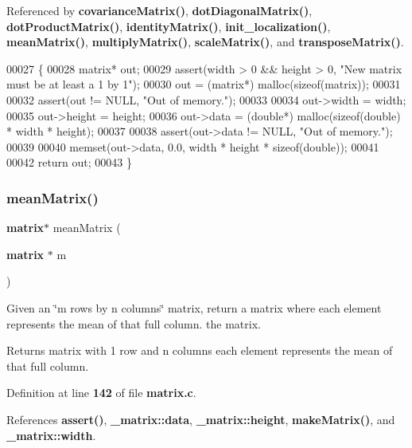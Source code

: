 Referenced by \textbf{ covariance\+Matrix()}, \textbf{ dot\+Diagonal\+Matrix()}, \textbf{ dot\+Product\+Matrix()}, \textbf{ identity\+Matrix()}, \textbf{ init\+\_\+localization()}, \textbf{ mean\+Matrix()}, \textbf{ multiply\+Matrix()}, \textbf{ scale\+Matrix()}, and \textbf{ transpose\+Matrix()}.


\begin{DoxyCode}
00027                                           \{
00028     matrix* out;
00029     assert(width > 0 && height > 0, \textcolor{stringliteral}{"New matrix must be at least a 1 by 1"});
00030     out = (matrix*) malloc(\textcolor{keyword}{sizeof}(matrix));
00031 
00032     assert(out != NULL, \textcolor{stringliteral}{"Out of memory."});
00033 
00034     out->width = width;
00035     out->height = height;
00036     out->data = (\textcolor{keywordtype}{double}*) malloc(\textcolor{keyword}{sizeof}(\textcolor{keywordtype}{double}) * width * height);
00037 
00038     assert(out->data != NULL, \textcolor{stringliteral}{"Out of memory."});
00039 
00040     memset(out->data, 0.0, width * height * \textcolor{keyword}{sizeof}(\textcolor{keywordtype}{double}));
00041 
00042     \textcolor{keywordflow}{return} out;
00043 \}
\end{DoxyCode}
\mbox{\label{matrix_8h_ae4babf9b518a2d5d6b12776191e3b7de}} 
\subsubsection{mean\+Matrix()}
{\footnotesize\ttfamily \textbf{ matrix}$\ast$ mean\+Matrix (\begin{DoxyParamCaption}\item[{\textbf{ matrix} $\ast$}]{m }\end{DoxyParamCaption})}



Given an \char`\"{}m rows by n columns\char`\"{} matrix, return a matrix where each element represents the mean of that full column.  the matrix. 

\begin{DoxyReturn}{Returns}
matrix with 1 row and n columns each element represents the mean of that full column. 
\end{DoxyReturn}


Definition at line \textbf{ 142} of file \textbf{ matrix.\+c}.



References \textbf{ assert()}, \textbf{ \+\_\+matrix\+::data}, \textbf{ \+\_\+matrix\+::height}, \textbf{ make\+Matrix()}, and \textbf{ \+\_\+matrix\+::width}.



